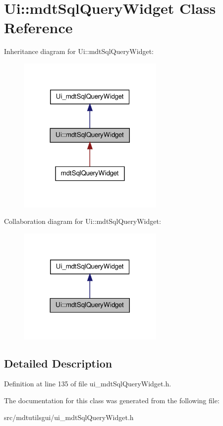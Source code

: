 \hypertarget{class_ui_1_1mdt_sql_query_widget}{
\section{Ui::mdtSqlQueryWidget Class Reference}
\label{class_ui_1_1mdt_sql_query_widget}
}


Inheritance diagram for Ui::mdtSqlQueryWidget:\nopagebreak
\begin{figure}[H]
\begin{center}
\leavevmode
\includegraphics[width=200pt]{class_ui_1_1mdt_sql_query_widget__inherit__graph}
\end{center}
\end{figure}


Collaboration diagram for Ui::mdtSqlQueryWidget:\nopagebreak
\begin{figure}[H]
\begin{center}
\leavevmode
\includegraphics[width=200pt]{class_ui_1_1mdt_sql_query_widget__coll__graph}
\end{center}
\end{figure}


\subsection{Detailed Description}


Definition at line 135 of file ui\_\-mdtSqlQueryWidget.h.



The documentation for this class was generated from the following file:\begin{DoxyCompactItemize}
\item 
src/mdtutilsgui/ui\_\-mdtSqlQueryWidget.h\end{DoxyCompactItemize}
